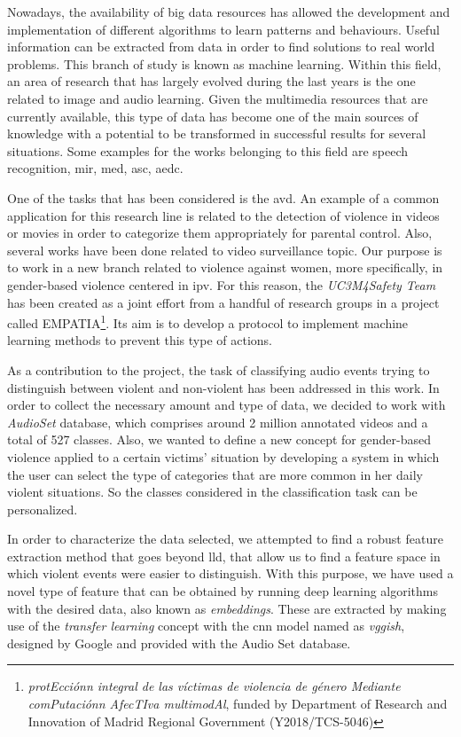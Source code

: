 	Nowadays, the availability of big data resources has allowed the development and implementation of different algorithms to learn patterns and behaviours. Useful information can be extracted from data in order to find solutions to real world problems. This branch of study is known as machine learning. Within this field, an area of research that has largely evolved during the last years is the one related to image and audio learning. Given the multimedia resources that are currently available, this type of data has become one of the main sources of knowledge with a potential to be transformed in successful results for several situations. Some examples for the works belonging to this field are speech recognition, \acrfull{mir}, \acrfull{med}, \acrfull{asc}, \acrfull{aedc}.
	
	One of the tasks that has been considered is the \acrfull{avd}. An example of a common application for this research line is related to the detection of violence in videos or movies in order to categorize them appropriately for parental control. Also, several works have been done related to video surveillance topic. Our purpose is to work in a new branch related to violence against women, more specifically, in gender-based violence centered in \acrfull{ipv}. For this reason, the \textit{UC3M4Safety Team} has been created as a joint effort from a handful of research groups in a project called EMPATIA\footnote{\textit{protEcciónn integral de las víctimas de violencia de género Mediante comPutaciónn AfecTIva multimodAl}, funded by Department  of  Research  and Innovation of Madrid Regional Government (Y2018/TCS-5046)}. Its aim is %
	to develop a protocol to implement machine learning methods to prevent this type of actions. 
	
	As a contribution to the project, the task of classifying audio events trying to distinguish between violent and non-violent has been addressed in this work. In order to collect the necessary amount and type of data, we decided to work with \textit{AudioSet} database, which comprises around 2 million annotated videos and a total of 527 classes. Also, we wanted to define a new concept for gender-based violence applied to a certain victims' situation by developing a system in which the user can select the type of categories that are more common in her daily violent situations. So the classes considered in the classification task can be personalized. 
	
	In order to characterize the data selected, we attempted to find a robust feature extraction method that goes beyond \acrfull{lld}, that allow us to find a feature space in which violent events were easier to distinguish. With this purpose, we have used a novel type of feature that can be obtained by running deep learning algorithms with the desired data, also known as \textit{embeddings}. These are extracted by making use of the \textit{transfer learning} concept with the \acrshort{cnn} model named as \textit{\acrshort{vgg}ish}, designed by Google and provided with the Audio Set database.
	
